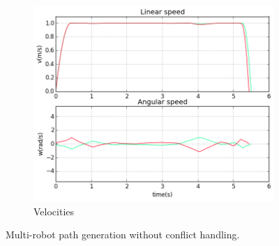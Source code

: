\begin{figure}[!h]
\begin{subfigure}[b]{0.48\textwidth}
                \includegraphics[width=\textwidth]{./images/vwc.png}
                \caption{Velocities}\label{fig:vwc}
        \end{subfigure}
        \caption{Multi-robot path generation without conflict handling.}\label{fig:wc}
\end{figure}

